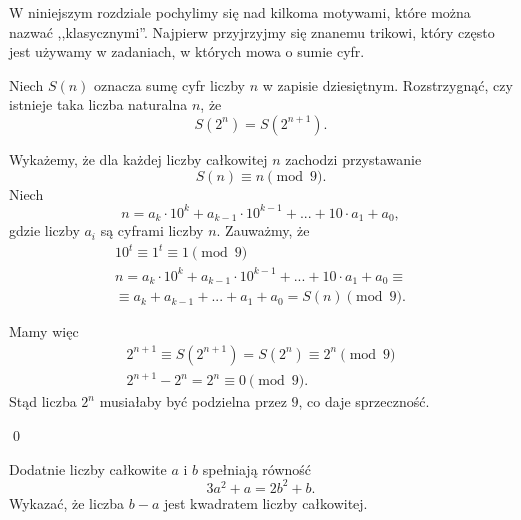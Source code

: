 

\noindent
W niniejszym rozdziale pochylimy się nad kilkoma motywami, które można nazwać ,,klasycznymi''. Najpierw przyjrzyjmy się znanemu trikowi, który często jest używamy w zadaniach, w których mowa o sumie cyfr.

\vspace{10px}


\noindent
Niech $S(n)$ oznacza sumę cyfr liczby $n$ w zapisie dziesiętnym.
Rozstrzygnąć, czy istnieje taka liczba naturalna $n$, że 
\[
	S(2^n) = S(2^{n + 1}).
\]

\vspace{5px}


\noindent
Wykażemy, że dla każdej liczby całkowitej $n$ zachodzi przystawanie
\[
	S(n) \equiv n \pmod{9}.
\]
Niech
\[
	n = a_k \cdot 10^k + a_{k - 1} \cdot 10^{k - 1} + ... + 10 \cdot a_1 + a_0,
\]
gdzie liczby $a_i$ są cyframi liczby $n$. Zauważmy, że
\begin{gather*}
	10^t \equiv 1^t \equiv 1 \pmod{9} \\
	n = a_k \cdot 10^k + a_{k - 1} \cdot 10^{k - 1} + ... + 10 \cdot a_1 + a_0 \equiv \\
	\equiv a_k + a_{k - 1} + ... + a_1 + a_0 = S(n) \pmod{9}.
\end{gather*}

\vspace{10px}
\noindent
Mamy więc
\begin{align*}
	2^{n + 1} \equiv S(2^{n + 1}) = S(2^n)  \equiv 2^n \pmod{9}\\
	2^{n + 1} - 2^n = 2^n \equiv 0 \pmod{9}.
\end{align*}
Stąd liczba $2^n$ musiałaby być podzielna przez $9$, co daje sprzeczność.

\qed


\vspace{10px}


\noindent
Dodatnie liczby całkowite $a$ i $b$ spełniają równość
\[
	3a^2 + a = 2b^2 + b.
\]
Wykazać, że liczba $b - a$ jest kwadratem liczby całkowitej.

\vspace{5px}


